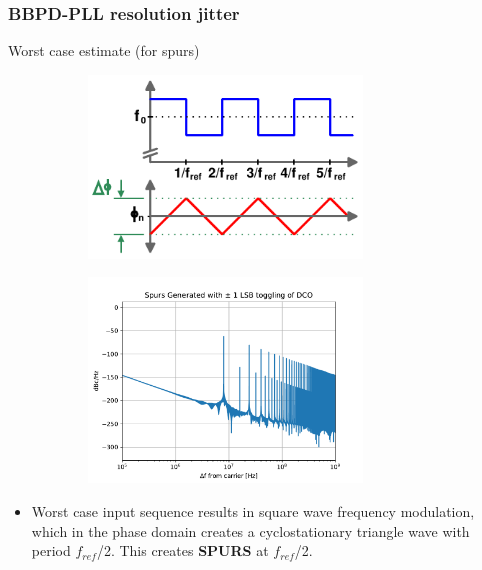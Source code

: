 \documentclass[t, screen, aspectratio=43]{beamer}
\begin{document}
\begin{frame}
	\frametitle{BBPD-PLL resolution jitter}
	\begin{block}{Worst case estimate (for spurs)}
	\begin{figure}[htb!]
	    \centering
	    \begin{subfigure}{0.5\textwidth}
	        \centering
	        \includegraphics[width=0.8\textwidth, angle=0]{bbpd_resolution_phase_walk}
	    \end{subfigure}%
	    \begin{subfigure}{0.5\textwidth}
	        \centering
	        \center\includegraphics[width=0.8\textwidth, angle=0]{spurs_dco}
	    \end{subfigure}
	\end{figure}
		\begin{itemize}[itemsep=4pt,label=\protect---]
			\tiny
			\item Worst case input sequence results in square wave frequency modulation, which in the phase domain creates a cyclostationary triangle wave with period $f_{ref}$/2. This creates \textbf{SPURS} at $f_{ref}$/2.

\end{itemize}
\end{block}
\end{frame}
\end{document}
